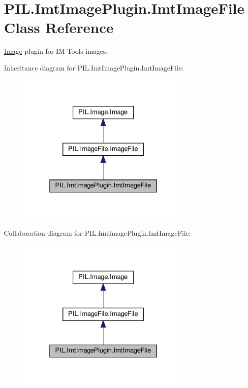 \hypertarget{classPIL_1_1ImtImagePlugin_1_1ImtImageFile}{}\section{P\+I\+L.\+Imt\+Image\+Plugin.\+Imt\+Image\+File Class Reference}
\label{classPIL_1_1ImtImagePlugin_1_1ImtImageFile}


\hyperlink{namespacePIL_1_1Image}{Image} plugin for IM Tools images.  




Inheritance diagram for P\+I\+L.\+Imt\+Image\+Plugin.\+Imt\+Image\+File\+:
\nopagebreak
\begin{figure}[H]
\begin{center}
\leavevmode
\includegraphics[width=243pt]{classPIL_1_1ImtImagePlugin_1_1ImtImageFile__inherit__graph}
\end{center}
\end{figure}


Collaboration diagram for P\+I\+L.\+Imt\+Image\+Plugin.\+Imt\+Image\+File\+:
\nopagebreak
\begin{figure}[H]
\begin{center}
\leavevmode
\includegraphics[width=243pt]{classPIL_1_1ImtImagePlugin_1_1ImtImageFile__coll__graph}
\end{center}
\end{figure}
